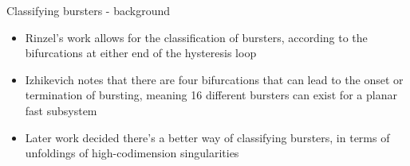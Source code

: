 \documentclass[,aspectratio=169]{beamer}
\begin{document}
\begin{frame}[label={sec:org6d3d776}]{Classifying bursters - background}
\begin{itemize}[<+->]
\item Rinzel's work allows for the classification of bursters, according to the bifurcations at either end of the hysteresis loop
\item Izhikevich notes that there are four bifurcations that can lead to the onset or termination of bursting, meaning 16 different bursters can exist for a planar fast subsystem
\item Later work decided there's a better way of classifying bursters, in terms of unfoldings of high-codimension singularities
\end{itemize}
\end{frame}
\end{document}
